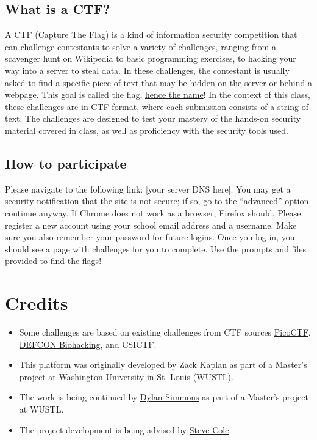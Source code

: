\documentclass[11pt]{article}
\begin{document}
\subsection{What is a CTF?}

A \href{https://en.wikipedia.org/wiki/Capture_the_flag_(cybersecurity)}{CTF (Capture The Flag)} is a kind of information security competition that can challenge contestants to solve a variety of challenges, ranging from a scavenger hunt on Wikipedia to basic programming exercises, to hacking your way into a server to steal data.
In these challenges, the contestant is usually asked to find a specific piece of text that may be hidden on the server or behind a webpage.
This goal is called the flag, \href{https://dev.to/atan/what-is-ctf-and-how-to-get-started-3f04}{hence the name}!
In the context of this class, these challenges are in CTF format, where each submission consists of a string of text.
The challenges are designed to test your mastery of the hands-on security material covered in class, as well as proficiency with the security tools used.

\subsection{How to participate}

Please navigate to the following link: [your server DNS here].
You may get a security notification that the site is not secure; if so, go to the ``advanced'' option continue anyway.
If Chrome does not work as a browser, Firefox should.
Please register a new account using your school email address and a username.
Make sure you also remember your password for future logins.
Once you log in, you should see a page with challenges for you to complete.
Use the prompts and files provided to find the flags!

\section{Credits}

\begin{itemize}
   \item Some challenges are based on existing challenges from CTF sources \href{https://www.picoctf.org/}{PicoCTF}, \href{https://www.defconbiohackingvillage.org/}{DEFCON Biohacking}, and CSICTF.
   \item This platform was originally developed by \href{mailto:zack.kaplan@wustl.edu}{Zack Kaplan} as part of a Master's project at \href{https://wustl.edu/}{Washington University in St. Louis (WUSTL)}.
   \item The work is being continued by \href{mailto:dylan.simmons@wustl.edu}{Dylan Simmons} as part of a Master's project at WUSTL.
   \item The project development is being advised by \href{mailto:svcole@wustl.edu}{Steve Cole}.
\end{itemize}
\end{document}
